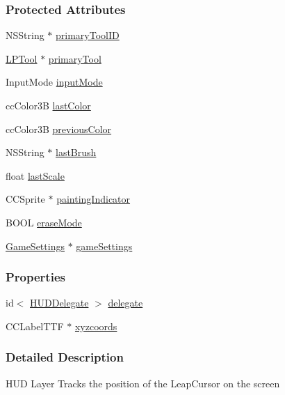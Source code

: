 \subsubsection*{Protected Attributes}
\begin{DoxyCompactItemize}
\item 
N\-S\-String $\ast$ \hyperlink{interface_h_u_d_layer_aae17304a5ecff2a6fa43471edb779341}{primary\-Tool\-I\-D}
\item 
\hyperlink{interface_l_p_tool}{L\-P\-Tool} $\ast$ \hyperlink{interface_h_u_d_layer_aad9b0e2b4164986e18ea0a9afcd1a914}{primary\-Tool}
\item 
Input\-Mode \hyperlink{interface_h_u_d_layer_a1e506792d581032644d75804beb359a7}{input\-Mode}
\item 
cc\-Color3\-B \hyperlink{interface_h_u_d_layer_a2d27bf64876ea6f0b2f0d1b9013c1cd7}{last\-Color}
\item 
cc\-Color3\-B \hyperlink{interface_h_u_d_layer_a2b737d7aa3b728dd3d5990ef4cb68f29}{previous\-Color}
\item 
N\-S\-String $\ast$ \hyperlink{interface_h_u_d_layer_ad7cb8a30419241ee8d2f2813031191be}{last\-Brush}
\item 
float \hyperlink{interface_h_u_d_layer_aedd1d8d2b2d31e203c3242d09390b561}{last\-Scale}
\item 
C\-C\-Sprite $\ast$ \hyperlink{interface_h_u_d_layer_a67d356e56a82f871b6c5de5818c5985d}{painting\-Indicator}
\item 
B\-O\-O\-L \hyperlink{interface_h_u_d_layer_aa1df984387a5f884acf38a7d733d6432}{erase\-Mode}
\item 
\hyperlink{interface_game_settings}{Game\-Settings} $\ast$ \hyperlink{interface_h_u_d_layer_a69515b3bf7bddc07e65bad3eaa4a2e7a}{game\-Settings}
\end{DoxyCompactItemize}
\subsubsection*{Properties}
\begin{DoxyCompactItemize}
\item 
id$<$ \hyperlink{protocol_h_u_d_delegate-p}{H\-U\-D\-Delegate} $>$ \hyperlink{interface_h_u_d_layer_a64cb26c1f8c5a76e8f392a02291c0cf6}{delegate}
\item 
C\-C\-Label\-T\-T\-F $\ast$ \hyperlink{interface_h_u_d_layer_ae0974aa467c08003e700e3d538f282c0}{xyzcoords}
\end{DoxyCompactItemize}


\subsubsection{Detailed Description}
H\-U\-D Layer Tracks the position of the Leap\-Cursor on the screen 

